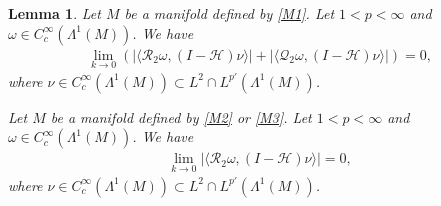 \documentclass[12pt]{amsart}
\newtheorem{lemma}[theorem]{Lemma}
\begin{document}




\begin{lemma}\label{lemma_1}
Let $M$ be a manifold defined by \eqref{M1}. Let $1<p<\infty$ and $\omega \in C_c^\infty(\Lambda^1(M))$. We have
\begin{align}
    \lim_{k\to 0}\left( |\langle \mathcal{R}_2\omega, (I-\mathcal{H})\nu \rangle| 
    +|\langle \mathcal{Q}_2 \omega, (I-\mathcal{H})\nu \rangle|
    \right)
    = 0,
\end{align}
where $\nu \in C_c^\infty(\Lambda^1(M)) \subset L^2\cap L^{p'}(\Lambda^1(M))$.

Let $M$ be a manifold defined by \eqref{M2} or \eqref{M3}. Let $1<p<\infty$ and $\omega \in C_c^\infty(\Lambda^1(M))$. We have
\begin{align}
    \lim_{k\to 0} |\langle \mathcal{R}_2\omega, (I-\mathcal{H})\nu \rangle|
    = 0,
\end{align}
where $\nu \in C_c^\infty(\Lambda^1(M)) \subset L^2\cap L^{p'}(\Lambda^1(M))$.
 
\end{lemma}
\end{document}
